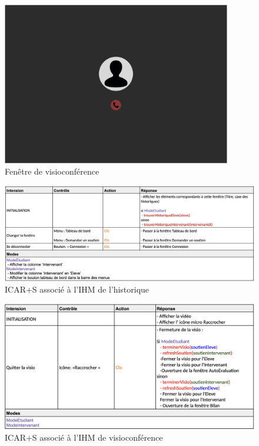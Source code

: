 \begin{figure}[H]
    \centering
    \includegraphics[width=10cm]{IHM/visio.png}
    \caption{Fenêtre de visioconférence}
\end{figure}

\begin{figure}[H]
    \centering
    \includegraphics[width=13cm]{ICARS/historique.png}
    \caption{ICAR+S associé à l'IHM de l'historique}
\end{figure}

\begin{figure}[H]
    \centering
    \includegraphics[width=13cm]{ICARS/visio.png}
    \caption{ICAR+S associé à l'IHM de visioconférence}
\end{figure}

